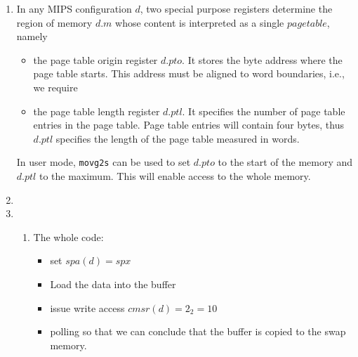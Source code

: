 \documentclass{article}
\begin{document}
\begin{enumerate}
{        }
        \item {
            In any MIPS configuration $d$, two special purpose registers determine the region of memory $d.m$ whose content is interpreted as a single $page table$, namely
            \begin{itemize}
                \item {
                    the page table origin register $d.pto$. It stores the byte address where the page table starts. This address must be aligned to word boundaries, i.e., we require
                }
                \item {
                    the page table length register $d.ptl$. It specifies the number of page table entries in the page table. Page table entries will contain four bytes, thus $d.ptl$ specifies the length of the page table measured in words.
                }
            \end{itemize}
            In user mode, \verb|movg2s| can be used to set $d.pto$ to the start of the memory and $d.ptl$ to the maximum. This will enable access to the whole memory.
        }
        \item {}
        \item {
            \begin{enumerate}
                \item {
                    The whole code:
                    \begin{itemize}
                        

                        \item set $spa(d) = spx$

                        

                        \item Load the data into the buffer
                        
                        

                        \item issue write access $cmsr(d) = 2_2 = 10$

                        


                        \item polling so that we can conclude that the buffer is copied to the swap memory.


\end{itemize}}
\end{enumerate}}
\end{enumerate}
\end{document}
